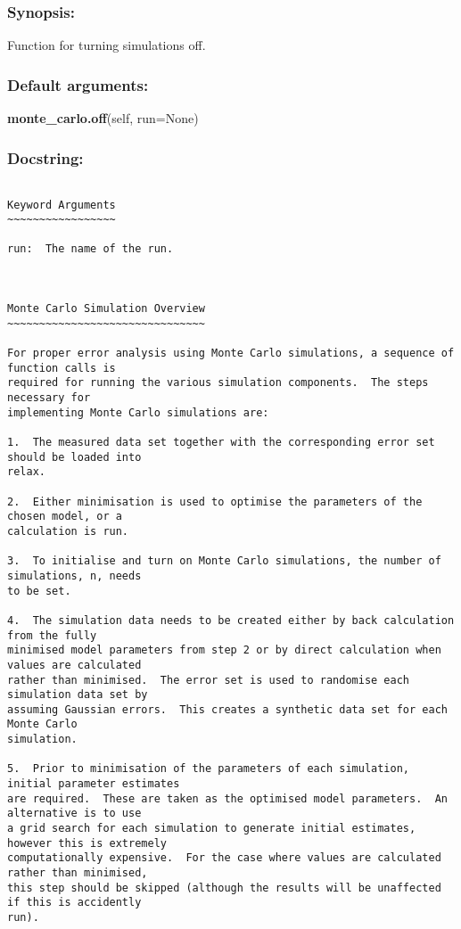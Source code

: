 \subsubsection{Synopsis:}

Function for turning simulations off.

\subsubsection{Default arguments:}

\textsf{\textbf{monte\_carlo.off}(self, run=None)
}


\subsubsection{Docstring:}

{\scriptsize
\begin{verbatim}

Keyword Arguments
~~~~~~~~~~~~~~~~~

run:  The name of the run.



Monte Carlo Simulation Overview
~~~~~~~~~~~~~~~~~~~~~~~~~~~~~~~

For proper error analysis using Monte Carlo simulations, a sequence of function calls is
required for running the various simulation components.  The steps necessary for
implementing Monte Carlo simulations are:

1.  The measured data set together with the corresponding error set should be loaded into
relax.

2.  Either minimisation is used to optimise the parameters of the chosen model, or a
calculation is run.

3.  To initialise and turn on Monte Carlo simulations, the number of simulations, n, needs
to be set.

4.  The simulation data needs to be created either by back calculation from the fully
minimised model parameters from step 2 or by direct calculation when values are calculated
rather than minimised.  The error set is used to randomise each simulation data set by
assuming Gaussian errors.  This creates a synthetic data set for each Monte Carlo
simulation.

5.  Prior to minimisation of the parameters of each simulation, initial parameter estimates
are required.  These are taken as the optimised model parameters.  An alternative is to use
a grid search for each simulation to generate initial estimates, however this is extremely
computationally expensive.  For the case where values are calculated rather than minimised,
this step should be skipped (although the results will be unaffected if this is accidently
run).


\end{verbatim}}
